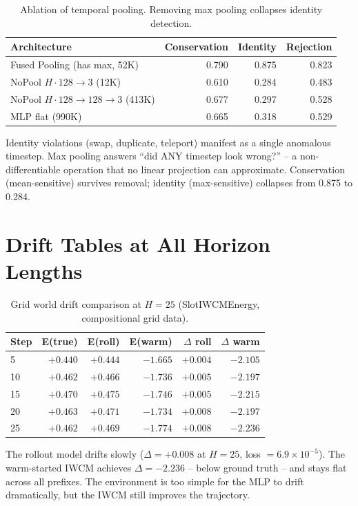 \documentclass[12pt]{article}
\begin{document}
\begin{table}[h]
\centering
\caption{Ablation of temporal pooling. Removing max pooling collapses identity detection.}
\label{app:tab:pooling}
\begin{tabular}{@{}lrrr@{}}
\toprule
Architecture & Conservation & Identity & Rejection \\
\midrule
Fused Pooling (has max, 52K) & 0.790 & 0.875 & 0.823 \\
NoPool $H\cdot128\to3$ (12K) & 0.610 & 0.284 & 0.483 \\
NoPool $H\cdot128\to128\to3$ (413K) & 0.677 & 0.297 & 0.528 \\
MLP flat (990K) & 0.665 & 0.318 & 0.529 \\
\bottomrule
\end{tabular}
\end{table}

Identity violations (swap, duplicate, teleport) manifest as a single anomalous timestep. Max pooling answers ``did ANY timestep look wrong?'' -- a non-differentiable operation that no linear projection can approximate. Conservation (mean-sensitive) survives removal; identity (max-sensitive) collapses from 0.875 to 0.284.

\section{Drift Tables at All Horizon Lengths}
\label{app:drift_tables}

\begin{table}[h]
\centering
\caption{Grid world drift comparison at $H=25$ (SlotIWCMEnergy, compositional grid data).}
\label{app:tab:grid_drift}
\begin{tabular}{@{}lrrrrr@{}}
\toprule
Step & E(true) & E(roll) & E(warm) & $\Delta$ roll & $\Delta$ warm \\
\midrule
5 & $+0.440$ & $+0.444$ & $-1.665$ & $+0.004$ & $-2.105$ \\
10 & $+0.462$ & $+0.466$ & $-1.736$ & $+0.005$ & $-2.197$ \\
15 & $+0.470$ & $+0.475$ & $-1.746$ & $+0.005$ & $-2.215$ \\
20 & $+0.463$ & $+0.471$ & $-1.734$ & $+0.008$ & $-2.197$ \\
25 & $+0.462$ & $+0.469$ & $-1.774$ & $+0.008$ & $-2.236$ \\
\bottomrule
\end{tabular}
\end{table}

The rollout model drifts slowly ($\Delta = +0.008$ at $H=25$, loss $=6.9\times 10^{-5}$). The warm-started IWCM achieves $\Delta = -2.236$ -- below ground truth -- and stays flat across all prefixes. The environment is too simple for the MLP to drift dramatically, but the IWCM still improves the trajectory.
\end{document}
